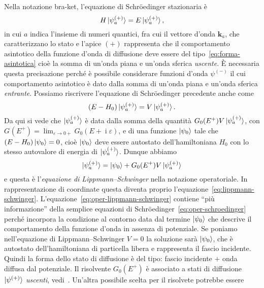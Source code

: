 \documentclass[a4paper,fleqn,twoside,12pt]{article}
\renewcommand{\epsilon}{\varepsilon}
\DeclareMathOperator{\uimm}{\mathrm{i}} %
\begin{document}
Nella notazione bra-ket, l'equazione di Schröedinger stazionaria è
\begin{equation}
  H \ket{\psi_{a}^{(+)}} = E \ket{\psi_{a}^{(+)}},
\end{equation}
in cui $a$ indica l'insieme di numeri quantici, fra cui il vettore d'onda
$\bm{k}_{a}$, che caratterizzano lo stato e l'apice $(+)$ rappresenta che il
comportamento asintotico della funzione d'onda di diffusione deve essere del
tipo~\eqref{eq:forma-asintotica} cioè la somma di un'onda piana e un'onda
sferica \emph{uscente}.  È necessaria questa precisazione perché è possibile
considerare funzioni d'onda $\psi^{(-)}$ il cui comportamento asintotico è dato
dalla somma di un'onda piana e un'onda sferica \emph{entrante}.  Possiamo
riscrivere l'equazione di Schröedinger precedente anche come
\begin{equation}
  \label{eq:oper-schroedinger}
  (E - H_{0})\ket{\psi_{a}^{(+)}} = V \ket{\psi_{a}^{(+)}}.
\end{equation}
Da qui si vede che $\ket{\psi_{a}^{(+)}}$ è data dalla somma della quantità
$G_{0}(E^{+})V\ket{\psi_{a}^{(+)}}$, con
$G_{}(E^{+})
= \lim_{\epsilon \to 0+} G_{0}(E + \uimm \epsilon)$,
e di una funzione $\ket{\psi_{0}}$ tale che $(E - H_{0})\ket{\psi_{0}} = 0$,
cioè $\ket{\psi_{0}}$ deve essere autostato dell'hamiltoniana $H_{0}$ con lo
stesso autovalore di energia di $\ket{\psi_{a}^{(+)}}$.  Dunque abbiamo
\begin{equation}
  \label{eq:oper-lippmann-schwinger}
  \ket{\psi_{a}^{(+)}} = \ket{\psi_{0}} + G_{0}(E^{+})V\ket{\psi_{a}^{(+)}}
\end{equation}
e questa è l'\emph{equazione di Lippmann–Schwinger} nella notazione
operatoriale.  In rappresentazione di coordinate questa diventa proprio
l'equazione~\eqref{eq:lippmann-schwinger}.
L'equazione~\eqref{eq:oper-lippmann-schwinger} contiene ``più informazione''
della semplice equazioni di Schröedinger~\eqref{eq:oper-schroedinger} perché
incorpora la condizione al contorno data dal termine $\ket{\psi_{0}}$ che
descrive il comportamento della funzione d'onda in assenza di potenziale.  Se
poniamo nell'equazione di Lippmann–Schwinger $V = 0$ la soluzione sarà
$\ket{\psi_{0}}$, che è autostato dell'hamiltoniana di particella libera e
rappresenta il fascio incidente.  Quindi la forma dello stato di diffusione è
del tipo: fascio incidente $+$ onda diffusa dal potenziale.  Il risolvente
$G_{0}(E^{+})$ è associato a stati di diffusione $\ket{\psi^{(+)}}$
\emph{uscenti}, vedi~\textcite[450-452]{ballentine:quantum-mechanics}.  Un'altra
possibile scelta per il risolvete potrebbe essere
\end{document}

